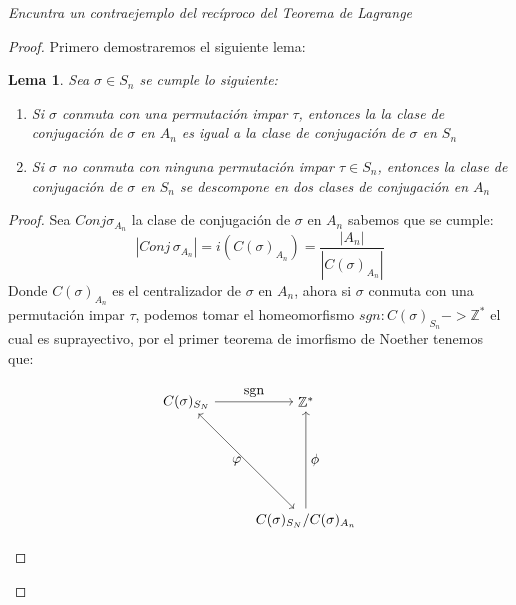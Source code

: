 \documentclass[11pt,letterpaper]{article}
\newtheorem*{lema}{Lema}
\newcommand{\Z}{\mathbb{Z}}
\begin{document}
\begin{tcolorbox}[
	title = \textcolor{black}{\textcolor{white}{Problema 9}},]
\textit{Encuntra un contraejemplo del rec\'iproco del Teorema de Lagrange 
}
\end{tcolorbox}
\begin{proof}
Primero demostraremos el siguiente lema:
\begin{lema}
    Sea $\sigma\in S_n$ se cumple lo siguiente:
    \begin{enumerate}
        \item Si $\sigma$ conmuta con una permutaci\'on impar $\tau$, entonces la 
        la clase de conjugaci\'on de $\sigma$ en $A_n$ es igual a la clase de conjugaci\'on de $\sigma$ en $S_n$
        \item Si $\sigma$ no conmuta con ninguna permutaci\'on impar $\tau\in S_n$, entonces la clase de conjugaci\'on de $\sigma$
        en $S_n$ se descompone en dos clases de conjugaci\'on en $A_n$
    \end{enumerate}
\end{lema}
\begin{proof}
    Sea $Conj \sigma_{A_n}$ la clase de conjugaci\'on de $\sigma$ en $A_n$ sabemos que se cumple:
    \begin{equation*}
        |Conj\,\sigma_{A_n}|=i(C(\sigma)_{A_n})=\frac{|A_n|}{|C(\sigma)_{A_n}|}
    \end{equation*}
    Donde $C(\sigma)_{A_n}$ es el centralizador de $\sigma$ en $A_n$, ahora si $\sigma$ conmuta con una permutaci\'on impar $\tau$, podemos tomar el homeomorfismo $sgn:C(\sigma)_{S_n}->\Z^{*}$ el cual es suprayectivo, por el primer
    teorema de imorfismo de Noether tenemos que:

\shorthandoff{<>}
\[
\begin{tikzpicture}[node distance=3cm]
  \node (A) {$C(\sigma )_{S_N}$};
  \node (B) [right of=A] {$\Z^*$};
  \node (C) [below of=B]{$C(\sigma )_{S_N}/C(\sigma )_{A_n}$};
  
  \draw[->] (A) -- (B) node[midway, above] {sgn};
  \draw[<-] (B) -- (C) node[midway, right] {$\phi$};
  \draw[<->] (A) -- (C) node[midway, left] {$\varphi$};
  

\end{tikzpicture}\]
\end{proof}
\end{proof}
\end{document}
